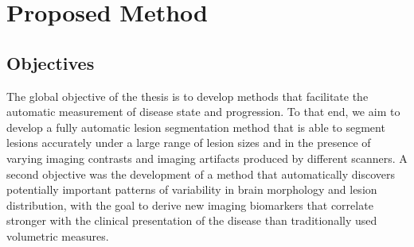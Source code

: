 % 

\section[Proposed method]{Proposed Method}

\subsection{Objectives}


The global objective of the thesis is to develop methods that facilitate the
automatic measurement of disease state and progression. To that end, we aim to
develop a fully automatic lesion segmentation method that is able to segment
lesions accurately under a large range of lesion sizes and in the presence of
varying imaging contrasts and imaging artifacts produced by different scanners.
A second objective was the development of a method that automatically discovers
potentially important patterns of variability in brain morphology and lesion
distribution, with the goal to derive new imaging biomarkers that correlate
stronger with the clinical presentation of the disease than traditionally used
volumetric measures.

